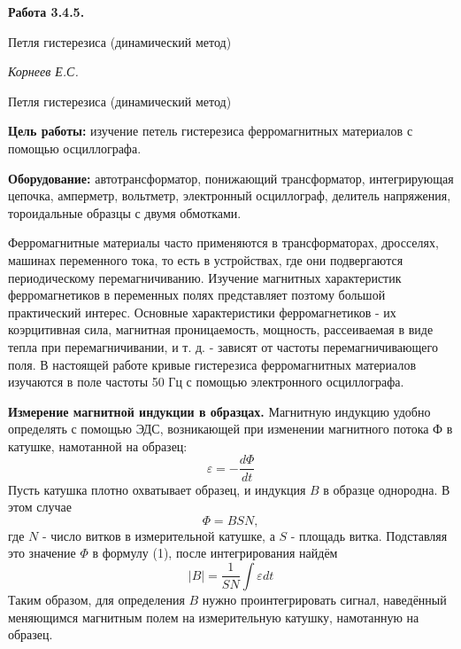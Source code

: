 \documentclass[14pt]{article}
\begin{document}
\begin{titlepage}
	\begin{center}
		\fontsize{18pt}{20pt}\selectfont
		\textbf{Работа 3.4.5.}	
	
		\vspace{5cm}
		\fontsize{24pt}{25pt}\selectfont
		Петля гистерезиса (динамический метод)
	\end{center}
	\begin{flushright}
		\fontsize{18pt}{20pt}\selectfont
		\vspace{14cm}
		\hspace{-3cm}
		\textit{Корнеев Е.С.}
	\end{flushright}		
\end{titlepage}

\begin{center}
	\fontsize{16pt}{18pt}\selectfont
	Петля гистерезиса (динамический метод)
\end{center}


\fontsize{14pt}{16pt}\selectfont
\vspace{1cm}
\textbf{Цель работы:} изучение петель гистерезиса ферромагнитных материалов с помощью осциллографа.

\vspace{0.5cm}
\textbf{Оборудование:} автотрансформатор, понижающий трансформатор, интегрирующая цепочка, амперметр, вольтметр, электронный осциллограф, делитель напряжения, тороидальные образцы с двумя обмотками. 

\vspace{1cm}
Ферромагнитные материалы часто применяются в трансформаторах, дросселях, машинах переменного тока, то есть в устройствах, где они подвергаются периодическому перемагничиванию. Изучение магнитных характеристик ферромагнетиков в переменных полях представляет позтому большой практический интерес. Основные характеристики ферромагнетиков - их коэрцитивная сила, магнитная проницаемость, мощность, рассеиваемая в виде тепла при перемагничивании, и т. д. - зависят от частоты перемагничивающего поля. В настоящей работе кривые гистерезиса ферромагнитных материалов изучаются в поле частоты 50 Гц с помощью электронного осциллографа.


\textbf{Измерение магнитной индукции в образцах.} Магнитную индукцию удобно определять с помощью ЭДС, возникающей при изменении магнитного потока Ф в катушке, намотанной на образец:
\begin{equation}
\varepsilon = -\frac{d\Phi}{dt}
\end{equation}
Пусть катушка плотно охватывает образец, и индукция $B$ в образце однородна. В этом случае
\begin{equation}
\Phi = BSN,
\end{equation}
где $N$ - число витков в измерительной катушке, а $S$ - площадь витка. Подставляя это значение $\Phi$ в формулу (1), после интегрирования
найдём
\begin{equation}
|B| = \frac{1}{SN}\int \varepsilon dt
\end{equation}
Таким образом, для определения $B$ нужно проинтегрировать сигнал, наведённый меняющимся магнитным полем на измерительную катушку, намотанную на образец.
\end{document}
